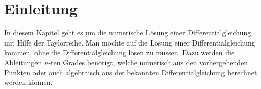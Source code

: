 %
%
%
\section{Einleitung
\label{taylor:section:einleitung}}
In diesem Kapitel geht es um die numerische Lösung einer Differentialgleichung mit Hilfe der Taylorreihe.
Man möchte auf die Lösung einer Differentialgleichung kommen, ohne die Differentialgleichung lösen zu müssen.
Dazu werden die Ableitungen $n$-ten Grades benötigt, welche numerisch aus den vorhergehenden Punkten oder auch algebraisch aus der bekannten Differentialgleichung berechnet werden können.

